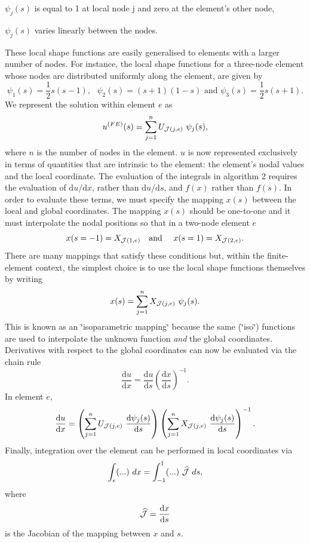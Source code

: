 \begin{DoxyItemize}
\item $ \psi_j(s) $ is equal to 1 at local node j and zero at the element's other node,
\item $ \psi_j(s) $ varies linearly between the nodes.
\end{DoxyItemize}These local shape functions are easily generalised to elements with a larger number of nodes. For instance, the local shape functions for a three-\/node element whose nodes are distributed uniformly along the element, are given by \[ \psi_1(s) = \frac{1}{2} s (s-1), \ \ \ \psi_2(s) = (s+1)(1-s) \mbox{\ \ \ and \ \ \ } \psi_3(s) = \frac{1}{2} s (s+1). \] We represent the solution within element $ e $ as \[ u^{(FE)}(s) = \sum_{j=1}^n U_{{\cal J}(j,e)} \ \psi_j(s), \] where $n$ is the number of nodes in the element. $ u $ is now represented exclusively in terms of quantities that are intrinsic to the element\-: the element's nodal values and the local coordinate. The evaluation of the integrals in algorithm 2 requires the evaluation of $ {\mbox{d} u}/{\mbox{d} x}$, rather than $ {\mbox{d} u}/{\mbox{d} s}$, and $f(x)$ rather than $f(s).$ In order to evaluate these terms, we must specify the mapping $ x(s) $ between the local and global coordinates. The mapping $ x(s) $ should be one-\/to-\/one and it must interpolate the nodal positions so that in a two-\/node element $e$ \[ x(s=-1) = X_{{\cal J}(1,e)} \mbox{\ \ \ and \ \ \ } x(s=1) = X_{{\cal J}(2,e)}.\] There are many mappings that satisfy these conditions but, within the finite-\/element context, the simplest choice is to use the local shape functions themselves by writing \[ x(s) = \sum_{j=1}^n X_{{\cal J}(j,e)} \ \psi_j(s). \] This is known as an \char`\"{}isoparametric mapping\char`\"{} because the same (\char`\"{}iso\char`\"{}) functions are used to interpolate the unknown function {\itshape and} the global coordinates. Derivatives with respect to the global coordinates can now be evaluated via the chain rule \[ \frac{\mbox{d} u}{\mbox{d} x} = \frac{\mbox{d} u}{\mbox{d} s} \left(\frac{\mbox{d} x}{\mbox{d} s}\right)^{-1}. \] In element $ e $, \[ \frac{\mbox{d} u}{\mbox{d} x} = \left(\sum_{j=1}^n U_{{\cal J}(j,e)} \ \frac{\mbox{d} \psi_j(s)}{\mbox{d} s} \right) \left(\sum_{j=1}^n X_{{\cal J}(j,e)} \ \frac{\mbox{d} \psi_j(s)}{\mbox{d} s} \right)^{-1}. \] Finally, integration over the element can be performed in local coordinates via \[ \int_e (...) \ dx = \int_{-1}^1 (...)\ \widehat{\cal J} \ ds, \] where \[ \widehat{\cal J} = \frac{\mbox{d} x}{\mbox{d} s} \] is the Jacobian of the mapping between $x$ and $ s. $

